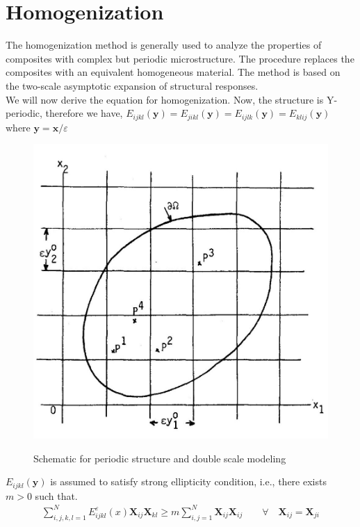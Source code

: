 \documentclass[openright,twoside]{iitkthesis}
\newcommand{\e}[1]{\textbf{#1}}
\begin{document}
\section{Homogenization}
The homogenization method is generally used to analyze the properties of composites with complex but periodic microstructure. The procedure replaces the composites with an equivalent homogeneous material. 
The method is based on the two-scale asymptotic expansion of structural responses.\\
We will now derive the equation for homogenization. 
Now, the structure is Y-periodic, therefore we have, $E_{ijkl}(\e y) =E_{jikl}(\e y) =E_{ijlk}(\e y) =E_{klij}(\e y)$ where $\e y = \e x/\varepsilon$
\begin{figure}[H]
\begin{center}
    \includegraphics[scale=0.2]{./Plots/homo/2.jpg}
    \label{fig:doublescale}
    \caption{Schematic for periodic structure and double scale modeling}
\end{center}
\end{figure}
\vspace{-0.5cm}
$E_{ijkl}(\e y)$ is assumed to satisfy strong ellipticity condition, i.e., there exists $m>0$ such that.
\begin{gather}
\sum_{i,j,k,l=1}^N E_{ijkl}^\varepsilon(x)\textbf{X}_{ij}\textbf{X}_{kl}\geq m\sum_{i,j=1}^N\textbf{X}_{ij}\textbf{X}_{ij} \qquad \forall \quad \textbf{X}_{ij}=\textbf{X}_{ji}
\end{gather}
\end{document}
